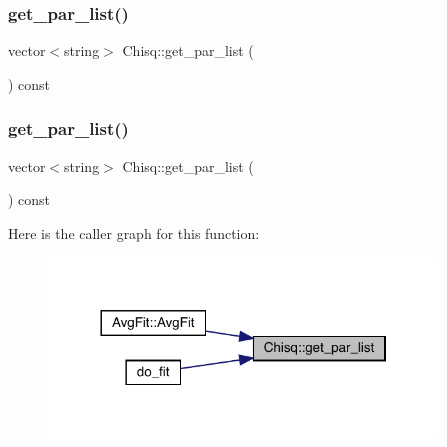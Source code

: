 \mbox{\label{classChisq_a2c9e190b411d2e6b225d2ca32b950a1e}} 
\subsubsection{\texorpdfstring{get\_par\_list()}{get\_par\_list()}\hspace{0.1cm}{\footnotesize\ttfamily [1/2]}}
{\footnotesize\ttfamily vector$<$string$>$ Chisq\+::get\+\_\+par\+\_\+list (\begin{DoxyParamCaption}{ }\end{DoxyParamCaption}) const\hspace{0.3cm}{\ttfamily [inline]}}

\mbox{\label{classChisq_a2c9e190b411d2e6b225d2ca32b950a1e}} 
\subsubsection{\texorpdfstring{get\_par\_list()}{get\_par\_list()}\hspace{0.1cm}{\footnotesize\ttfamily [2/2]}}
{\footnotesize\ttfamily vector$<$string$>$ Chisq\+::get\+\_\+par\+\_\+list (\begin{DoxyParamCaption}{ }\end{DoxyParamCaption}) const\hspace{0.3cm}{\ttfamily [inline]}}

Here is the caller graph for this function\+:
\nopagebreak
\begin{figure}[H]
\begin{center}
\leavevmode
\includegraphics[width=293pt]{dd/da9/classChisq_a2c9e190b411d2e6b225d2ca32b950a1e_icgraph}
\end{center}
\end{figure}
\mbox{\label{classChisq_a321122741639e94feeb3bff1eeadd1e7}} 
